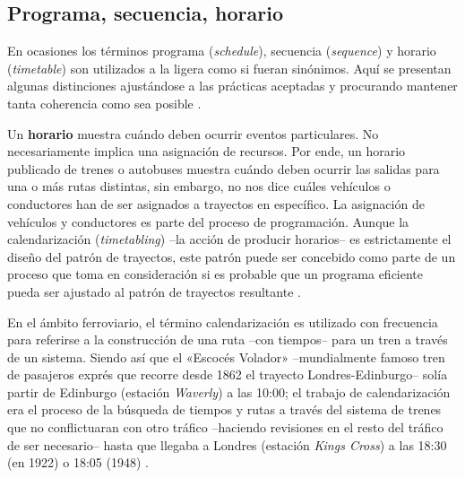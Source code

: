 \documentclass[draft,12pt,headsepline,footsepline,paper=letter]{scrreprt}
\begin{document}
\subsection{Programa, secuencia, horario}
\label{programa_secuencia_horario}

En ocasiones los términos programa (\textit{schedule}), secuencia (\textit{sequence}) y horario (\textit{timetable}) son utilizados a la ligera como si fueran sinónimos. Aquí se presentan algunas distinciones ajustándose a las prácticas aceptadas y procurando mantener tanta coherencia como sea posible \citep[p.~48]{wren95scheduling-timetabling}.

Un \textbf{horario} muestra cuándo deben ocurrir eventos particulares. No necesariamente implica una asignación de recursos. Por ende, un horario publicado de trenes o autobuses muestra cuándo deben ocurrir las salidas para una o más rutas distintas, sin embargo, no nos dice cuáles vehículos o conductores han de ser asignados a trayectos en específico.
%
La asignación de vehículos y conductores es parte del proceso de programación. Aunque la calendarización (\textit{timetabling}) –la acción de producir horarios– es estrictamente el diseño del patrón de trayectos, este patrón puede ser concebido como parte de un proceso que toma en consideración si es probable que un programa eficiente pueda ser ajustado al patrón de trayectos resultante \cite[p.~48]{wren95scheduling-timetabling}.

En el ámbito ferroviario, el término calendarización es utilizado con frecuencia para referirse a la construcción de una ruta –con tiempos– para un tren a través de un sistema. Siendo así que el «Escocés Volador» –mundialmente famoso tren de pasajeros exprés que recorre desde 1862 el trayecto Londres-Edinburgo– solía partir de Edinburgo (estación \textit{Waverly}) a las 10:00; el trabajo de calendarización era el proceso de la búsqueda de tiempos y rutas a través del sistema de trenes que no conflictuaran con otro tráfico –haciendo revisiones en el resto del tráfico de ser necesario– hasta que llegaba a Londres (estación \textit{Kings Cross}) a las 18:30 (en 1922) o 18:05 (1948) 
\citep[p.~48, 49]{wren95scheduling-timetabling}.
\end{document}

